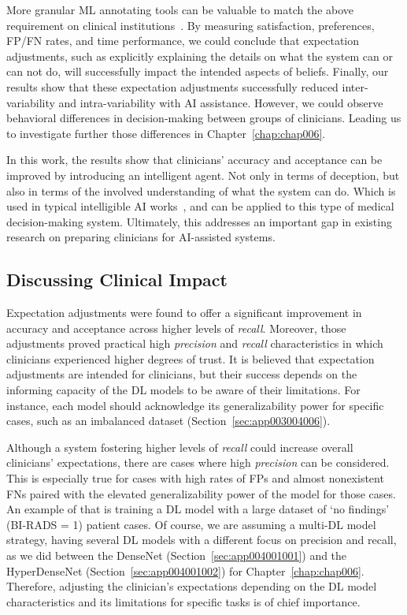 More granular \ac{ML} annotating tools can be valuable to match the above requirement  on clinical institutions~\cite{Kocielnik:2019:YAI:3290605.3300641}.
By measuring satisfaction, preferences, \ac{FP}/\ac{FN} rates, and time performance, we could conclude that expectation adjustments, such as explicitly explaining the details on what the system can or can not do, will successfully impact the intended aspects of beliefs.
Finally, our results show that these expectation adjustments successfully reduced inter-variability and intra-variability with \ac{AI} assistance.
However, we could observe behavioral differences in decision-making between groups of clinicians.
Leading us to investigate further those differences in Chapter~\ref{chap:chap006}.

In this work, the results show that clinicians' accuracy and acceptance can be improved by introducing an intelligent agent.
Not only in terms of deception, but also in terms of the involved understanding of what the system can do.
Which is used in typical intelligible \ac{AI} works~\cite{10.1145/3173574.3174156}, and can be applied to this type of medical decision-making system.
Ultimately, this addresses an important gap in existing research on preparing clinicians for \ac{AI}-assisted systems.

\subsection{Discussing Clinical Impact}
\label{sec:app003005001}

Expectation adjustments were found to offer a significant improvement in accuracy and acceptance across higher levels of {\it recall}.
Moreover, those adjustments proved practical high {\it precision} and {\it recall} characteristics in which clinicians experienced higher degrees of trust.
It is believed that expectation adjustments are intended for clinicians, but their success depends on the informing capacity of the \ac{DL} models to be aware of their limitations.
For instance, each model should acknowledge its generalizability power for specific cases, such as an imbalanced dataset (Section~\ref{sec:app003004006}).

Although a system fostering higher levels of {\it recall} could increase overall clinicians' expectations, there are cases where high {\it precision} can be considered.
This is especially true for cases with high rates of \acp{FP} and almost nonexistent \acp{FN} paired with the elevated generalizability power of the model for those cases.
An example of that is training a \ac{DL} model with a large dataset of `no findings' (\ac{BI-RADS} = 1) patient cases.
Of course, we are assuming a multi-\acs{DL} model strategy, having several \ac{DL} models with a different focus on precision and recall, as we did between the DenseNet (Section~\ref{sec:app004001001}) and the HyperDenseNet (Section~\ref{sec:app004001002}) for Chapter~\ref{chap:chap006}.
Therefore, adjusting the clinician's expectations depending on the \ac{DL} model characteristics and its limitations for specific tasks is of chief importance.

